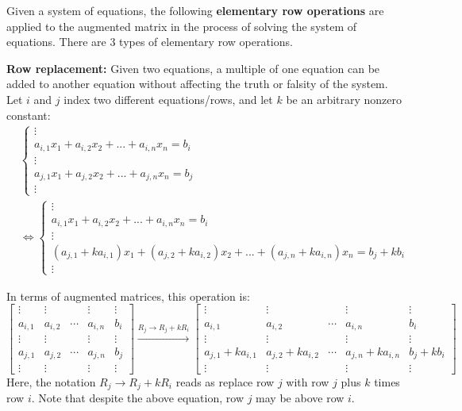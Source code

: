 \documentclass{article}
\begin{document}
Given a system of equations, the following {\bf elementary row operations} are applied to the augmented matrix in the process of solving the system of equations. There are \(3\) types of elementary row operations.

\vspace{5mm}

{\bf Row replacement:} Given two equations, a multiple of one equation can be added to another equation without affecting the truth or falsity of the system. Let \(i\) and \(j\) index two different equations/rows, and let \(k\) be an arbitrary nonzero constant: 
\begin{align*}
& \left\{\begin{array}{c}
\vdots \\
a_{i,1} x_1 + a_{i,2} x_2 + ... + a_{i,n} x_n = b_i \\
\vdots \\
a_{j,1} x_1 + a_{j,2} x_2 + ... + a_{j,n} x_n = b_j \\
\vdots
\end{array}\right. \\
& \iff
\left\{\begin{array}{c}
\vdots \\
a_{i,1} x_1 + a_{i,2} x_2 + ... + a_{i,n} x_n = b_i \\
\vdots \\
(a_{j,1} + ka_{i,1}) x_1 + (a_{j,2} + ka_{i,2}) x_2 + ... + (a_{j,n} + ka_{i,n}) x_n = b_j + kb_i \\
\vdots
\end{array}\right.
\end{align*}

In terms of augmented matrices, this operation is:
\[\left[\begin{array}{cccc|c}
\vdots & \vdots &  & \vdots & \vdots \\   
a_{i,1} & a_{i,2} & \cdots & a_{i,n} & b_i \\   
\vdots & \vdots &  & \vdots & \vdots \\ 
a_{j,1} & a_{j,2} & \cdots & a_{j,n} & b_j \\
\vdots & \vdots &  & \vdots & \vdots
\end{array}\right] 
\xrightarrow{R_j \rightarrow R_j + kR_i} 
\left[\begin{array}{cccc|c}
\vdots & \vdots &  & \vdots & \vdots \\   
a_{i,1} & a_{i,2} & \cdots & a_{i,n} & b_i \\   
\vdots & \vdots &  & \vdots & \vdots \\ 
a_{j,1} + ka_{i, 1} & a_{j,2} + ka_{i, 2} & \cdots & a_{j,n} + ka_{i,n} & b_j + kb_i \\
\vdots & \vdots &  & \vdots & \vdots
\end{array}\right]\]
Here, the notation \(R_j \rightarrow R_j + kR_i\) reads as replace row \(j\) with row \(j\) plus \(k\) times row \(i\). Note that despite the above equation, row \(j\) may be above row \(i\).
\end{document}
